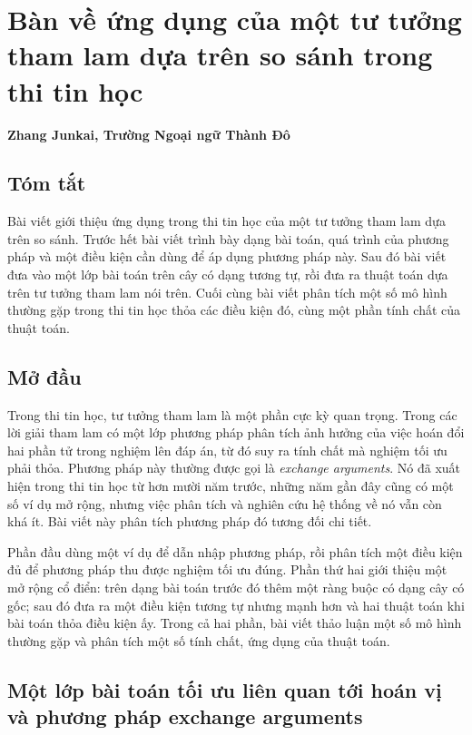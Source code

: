 \documentclass[11pt]{article}
\begin{document}
\section{Bàn về ứng dụng của một tư tưởng tham lam dựa trên so sánh trong thi tin học}

\begin{center}
\textbf{Zhang Junkai, Trường Ngoại ngữ Thành Đô}
\end{center}

\subsection*{Tóm tắt}

Bài viết giới thiệu ứng dụng trong thi tin học của một tư tưởng tham lam dựa
trên so sánh. Trước hết bài viết trình bày dạng bài toán, quá trình của phương
pháp và một điều kiện cần dùng để áp dụng phương pháp này. Sau đó bài viết đưa
vào một lớp bài toán trên cây có dạng tương tự, rồi đưa ra thuật toán dựa trên
tư tưởng tham lam nói trên. Cuối cùng bài viết phân tích một số mô hình thường
gặp trong thi tin học thỏa các điều kiện đó, cùng một phần tính chất của thuật
toán.

\subsection{Mở đầu}

Trong thi tin học, tư tưởng tham lam là một phần cực kỳ quan trọng. Trong các
lời giải tham lam có một lớp phương pháp phân tích ảnh hưởng của việc hoán đổi
hai phần tử trong nghiệm lên đáp án, từ đó suy ra tính chất mà nghiệm tối ưu
phải thỏa. Phương pháp này thường được gọi là \emph{exchange arguments}. Nó đã
xuất hiện trong thi tin học từ hơn mười năm trước, những năm gần đây cũng có
một số ví dụ mở rộng, nhưng việc phân tích và nghiên cứu hệ thống về nó vẫn còn
khá ít. Bài viết này phân tích phương pháp đó tương đối chi tiết.

Phần đầu dùng một ví dụ để dẫn nhập phương pháp, rồi phân tích một điều kiện đủ
để phương pháp thu được nghiệm tối ưu đúng. Phần thứ hai giới thiệu một mở rộng
cổ điển: trên dạng bài toán trước đó thêm một ràng buộc có dạng cây có gốc; sau
đó đưa ra một điều kiện tương tự nhưng mạnh hơn và hai thuật toán khi bài toán
thỏa điều kiện ấy. Trong cả hai phần, bài viết thảo luận một số mô hình thường
gặp và phân tích một số tính chất, ứng dụng của thuật toán.

\subsection{Một lớp bài toán tối ưu liên quan tới hoán vị và phương pháp exchange arguments}
\end{document}
